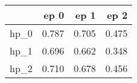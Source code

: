 \begin{tabular}{lrrr}
\toprule
{} &   ep 0 &   ep 1 &   ep 2 \\
\midrule
hp\_0 &  0.787 &  0.705 &  0.475 \\
hp\_1 &  0.696 &  0.662 &  0.348 \\
hp\_2 &  0.710 &  0.678 &  0.456 \\
\bottomrule
\end{tabular}
